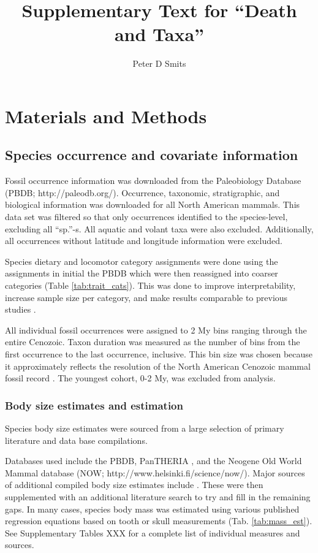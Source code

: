 \documentclass{article}
\title{Supplementary Text for ``Death and Taxa''}
\author{Peter D Smits}
\begin{document}
\maketitle

\section{Materials and Methods}

\subsection{Species occurrence and covariate information}
Fossil occurrence information was downloaded from the Paleobiology Database (PBDB; http://paleodb.org/). Occurrence, taxonomic, stratigraphic, and biological information was downloaded for all North American mammals. This data set was filtered so that only occurrences identified to the species-level, excluding all ``sp.''-s. All aquatic and volant taxa were also excluded. Additionally, all occurrences without latitude and longitude information were excluded.

Species dietary and locomotor category assignments were done using the assignments in initial the PBDB which were then reassigned into coarser categories (Table \ref{tab:trait_cats}). This was done to improve interpretability, increase sample size per category, and make results comparable to previous studies \cite{Jernvall2004,Price2012}.

All individual fossil occurrences were assigned to 2 My bins ranging through the entire Cenozoic. Taxon duration was measured as the number of bins from the first occurrence to the last occurrence, inclusive. This bin size was chosen because it approximately reflects the resolution of the North American Cenozoic mammal fossil record \cite{Alroy2009,Alroy2000g,Marcot2014}. The youngest cohort, 0-2 My, was excluded from analysis.


\subsubsection{Body size estimates and estimation}
Species body size estimates were sourced from a large selection of primary literature and data base compilations.

Databases used include the PBDB, PanTHERIA \cite{Jones2009c}, and the Neogene Old World Mammal database (NOW; http://www.helsinki.fi/science/now/). Major sources of additional compiled body size estimates include \cite{Brook2004a,Freudenthal2013,McKenna2011,Raia2012f,Smith2004c,Tomiya2013}. These were then supplemented with an additional literature search to try and fill in the remaining gaps. In many cases, species body mass was estimated using various published regression equations based on tooth or skull measurements (Tab. \ref{tab:mass_est}). See Supplementary Tables XXX for a complete list of individual measures and sources.
\end{document}
